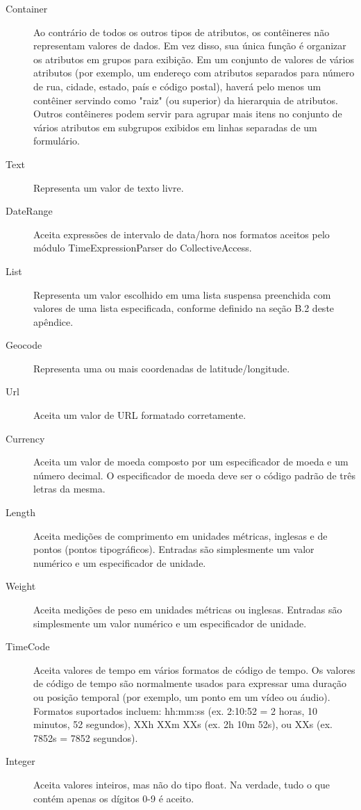 \begin{description}
	\item [Container] Ao contrário de todos os outros tipos de atributos, os contêineres não representam valores de dados. Em vez disso, sua única função é organizar os atributos em grupos para exibição. Em um conjunto de valores de vários atributos (por exemplo, um endereço com atributos separados para número de rua, cidade, estado, país e código postal), haverá pelo menos um contêiner servindo como "raiz" (ou superior) da hierarquia de atributos. Outros contêineres podem servir para agrupar mais itens no conjunto de vários atributos em subgrupos exibidos em linhas separadas de um formulário.
	\item [Text] Representa um valor de texto livre.
	\item [DateRange] Aceita expressões de intervalo de data/hora nos formatos aceitos pelo módulo TimeExpressionParser do CollectiveAccess.
	\item [List] Representa um valor escolhido em uma lista suspensa preenchida com valores de uma lista especificada, conforme definido na seção B.2 deste apêndice.
	\item [Geocode] Representa uma ou mais coordenadas de latitude/longitude.
	\item [Url] Aceita um valor de URL formatado corretamente.
	\item [Currency] Aceita um valor de moeda composto por um especificador de moeda e um número decimal. O especificador de moeda deve ser o código padrão de três letras da mesma.
	\item [Length] Aceita medições de comprimento em unidades métricas, inglesas e de pontos (pontos tipográficos). Entradas são simplesmente um valor numérico e um especificador de unidade.
	\item [Weight] Aceita medições de peso em unidades métricas ou inglesas. Entradas são simplesmente um valor numérico e um especificador de unidade.
	\item [TimeCode] Aceita valores de tempo em vários formatos de código de tempo. Os valores de código de tempo são normalmente usados para expressar uma duração ou posição temporal (por exemplo, um ponto em um vídeo ou áudio). Formatos suportados incluem: hh:mm:ss (ex. 2:10:52 = 2 horas, 10 minutos, 52 segundos), XXh XXm XXs (ex. 2h 10m 52s), ou XXs (ex. 7852s = 7852 segundos).
	\item [Integer] Aceita valores inteiros, mas não do tipo float. Na verdade, tudo o que contém apenas os dígitos 0-9 é aceito.

\end{description}

